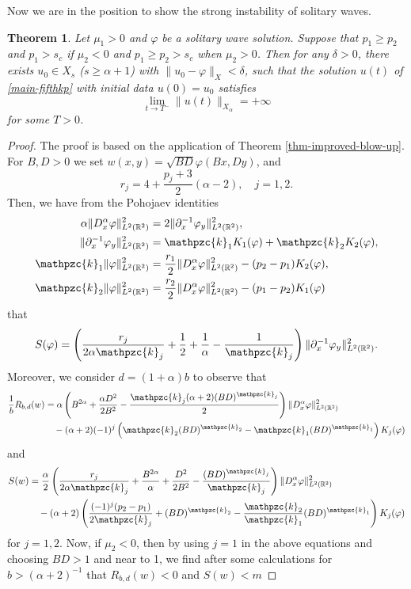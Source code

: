\documentclass[10pt]{article}
\numberwithin{equation}{section}
\newtheorem{theorem}{\quad Theorem}[section]
\newcommand{\ps}{\mathpzc{k}}
\newcommand{\lt}{{L^2(\mathbb{R}^2)}}
\newcommand{\ff}{\varphi}
\newcommand{\x}{{X_\alpha}}
\newcommand{\nd}{{\partial_x^{-1}}}
\newcommand{\dx}{D_x^{\alpha}}
\newcommand{\moo}{\mu_2}  \newcommand{\poo}{{p_2}}
\newcommand{\al}{\alpha}
\newcommand{\rrr}{{R_{b,d}}}
\begin{document}
	Now we are in the position to show the strong instability of solitary waves.
	
	\begin{theorem}\label{instability-theorem}
		Let $\mu_1>0$ and $\ff$ be a solitary wave solution.  Suppose that  $p_1\geq p_2$ and $p_1>s_c$	if $\moo<0$ and
		$ 	p_1\geq p_2>s_c	$ 	when $\mu_2>0$.
		Then	  for any $\delta>0$, there exists $u_0\in X_s$ ($s\geq\al+1$) with $\|u_0-\ff\|_{{X}}<\delta$, such that the solution $u(t)$ of \eqref{main-fifthkp} with initial data $u(0)=u_0$ satisfies $$\displaystyle\lim_{t\to T^-}\|u(t)\|_\x=+\infty$$ for some $T>0$.
	\end{theorem}
	
	\begin{proof}
		The proof is based on the application of Theorem \ref{thm-improved-blow-up}. For $B,D>0$ we set $w(x,y)=\sqrt{BD}\ff(Bx,Dy)$, and
		\[
		r_j=4+\frac{p_j+3}{2}(\al-2),\quad j=1,2.
		\]
		Then, we have from the Pohojaev identities
		\begin{equation}\label{poho-b}
			\begin{split}
				\al\|\dx\ff\|_\lt^2&=2\|\nd\ff_y\|_\lt^2,\\
				\|\nd\ff_y\|_\lt^2&=\ps_1K_1(\ff)+\ps_2K_2(\ff) ,\\
				\ps_1\|\ff\|_\lt^2&=\frac{r_1}{2}\|\dx\ff\|_\lt^2-(\poo-\po)K_2(\ff),\\
				\ps_2\|\ff\|_\lt^2&=\frac{r_2}{2}\|\dx\ff\|_\lt^2-(\po-\poo)K_1(\ff)
			\end{split}
		\end{equation}
		that
		\[
		S(\ff)= \left(\frac{r_j}{2\al\ps_j}+\frac12+\frac1\al-\frac{1}{\ps_j}\right)   \|\nd\ff_y\|_\lt^2.
		\]
		Moreover, we consider $d=(1+\al)b$ to observe that
		\[
		\begin{split}
			\frac{1}{b}\rrr(w)&=\al\left(B^{2\al}+\frac{\al D^2}{2B^2}-\frac{\ps_j(\al+2)(BD)^{\ps_j}}{2}\right)\|\dx\ff\|_\lt^2\\
			&\quad-(\al+2)(-1)^j\left(\ps_2(BD)^{\ps_2}-\ps_1(BD)^{\ps_1}\right)K_j(\ff)
		\end{split}
		\]
		and
		\[
		\begin{split}
			S(w)&=\frac{\al}{2}\left(\frac{r_j}{2\al\ps_j}+\frac{B^{2\al}}{\al}+\frac{D^2}{2B^2}-\frac{(BD)^{\ps_j}}{\ps_j}\right)\|\dx\ff\|_\lt^2\\
			&\quad-(\al+2)\left(\frac{(-1)^j(\poo-\po)}{2\ps_j}+(BD)^{\ps_2}-\frac{\ps_2}{\ps_1}(BD)^{\ps_1}\right)K_j(\ff) 
		\end{split}
		\]
		for $j=1,2$. Now, if $\mu_2<0$, then by using $j=1$ in the above equations and choosing $BD>1$ and near to 1, we find after some calculations for $b>(\al+2)^{-1}$ that $\rrr(w)<0$ and $S(w)<m$

\end{proof}
\end{document}
